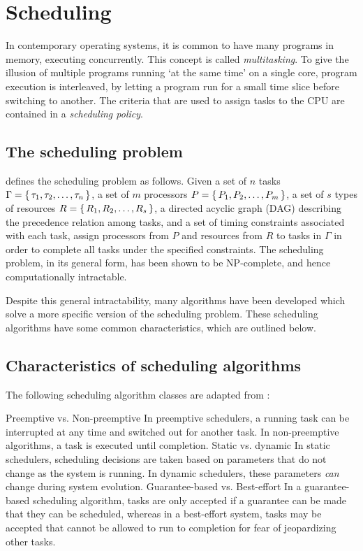 \documentclass[twoside]{uva-inf-bachelor-thesis}
\begin{document}
\section{Scheduling}
In contemporary operating systems, it is common to have many programs in memory, executing concurrently. This concept is called \textit{multitasking}. To give the illusion of multiple programs running `at the same time' on a single core, program execution is interleaved, by letting a program run for a small time slice before switching to another. The criteria that are used to assign tasks to the CPU are contained in a \textit{scheduling policy}. 

\subsection{The scheduling problem}
\textcite{buttazzo2011hard} defines the scheduling problem as follows. Given a set of $n$ tasks $\Gamma = \set{\tau_1, \tau_2, \ldots, \tau_n}$, a set of $m$ processors $P = \set{P_1, P_2, \ldots, P_m}$, a set of $s$ types of resources $R = \set{R_1, R_2, \ldots, R_s}$, a directed acyclic graph (DAG) describing the precedence relation among tasks, and a set of timing constraints associated with each task, assign processors from $P$ and resources from $R$ to tasks in $\Gamma$ in order to complete all tasks under the specified constraints. The scheduling problem, in its general form, has been shown to be NP-complete, and hence computationally intractable.

Despite this general intractability, many algorithms have been developed which solve a more specific version of the scheduling problem. These scheduling algorithms have some common characteristics, which are outlined below.

\subsection{Characteristics of scheduling algorithms}
The following scheduling algorithm classes are adapted from \textcite{buttazzo2011hard}:
\begin{outline}
    \1 Preemptive vs. Non-preemptive
        \2 In preemptive schedulers, a running task can be interrupted at any time and switched out for another task.
        \2 In non-preemptive algorithms, a task is executed until completion.
    \1 Static vs. dynamic
        \2 In static schedulers, scheduling decisions are taken based on parameters that do not change as the system is running. In dynamic schedulers, these parameters \emph{can} change during system evolution.
    \1 Guarantee-based vs. Best-effort
        \2 In a guarantee-based scheduling algorithm, tasks are only accepted if a guarantee can be made that they can be scheduled, whereas in a best-effort system, tasks may be accepted that cannot be allowed to run to completion for fear of jeopardizing other tasks.
\end{outline}
\end{document}
